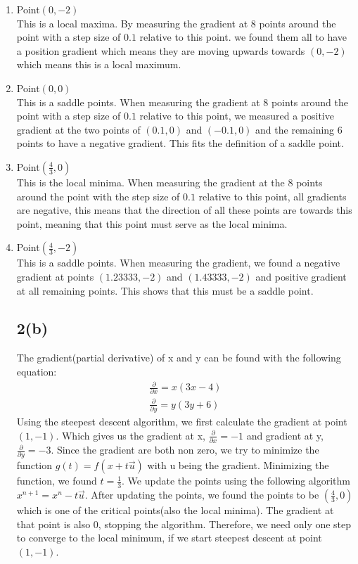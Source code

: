 \documentclass{article}
\begin{document}
\begin{enumerate}
\item Point$(0,-2)$\\
This is a local maxima. By measuring the gradient at 8 points around the point with a step size of $0.1$ relative to this point. we found them all to have a position gradient which means they are moving upwards towards $(0,-2)$ which means this is a local maximum.
\item Point$(0,0)$\\
This is a saddle points. When measuring the gradient at 8 points around the point with a step size of $0.1$ relative to this point, we measured a positive gradient at the two points of $(0.1,0)$ and $(-0.1,0)$ and the remaining 6 points to have a negative gradient. This fits the definition of a saddle point.
\item Point$(\frac{4}{3},0)$\\
This is the local minima. When measuring the gradient at the 8 points around the point with the step size of $0.1$ relative to this point, all gradients are negative, this means that the direction of all these points are towards this point, meaning that this point must serve as the local minima.
\item Point$(\frac{4}{3},-2)$\\
This is a saddle points. When measuring the gradient, we found a negative gradient at points $(1.23333,-2)$ and $(1.43333,-2)$ and positive gradient at all remaining points. This shows that this must be a saddle point.
\subsection*{2(b)}
The gradient(partial derivative) of x and y can be found with the following equation:
\begin{equation*}
\begin{aligned}
\frac{\partial}{\partial x}  = x(3x - 4)\\
\frac{\partial}{\partial y}  = y(3y + 6)
\end{aligned}
\end{equation*}
Using the steepest descent algorithm, we first calculate the gradient at point $(1,-1)$. Which gives us the gradient at x, $\frac{\partial}{\partial x} = -1$ and gradient at y, $\frac{\partial}{\partial y} = -3$. Since the gradient are both non zero, we try to minimize the function $g(t) = f(x + t\vec{u})$ with u being the gradient. Minimizing the function, we found $t = \frac{1}{3}$. We update the points using the following algorithm $x^{n+1} = x^{n} - t\vec{u}$. After updating the points, we found the points to be $(\frac{4}{3},0)$ which is one of the critical points(also the local minima). The gradient at that point is also $0$, stopping the algorithm. Therefore, we need only one step to converge to the local minimum, if we start steepest descent at point $(1,-1)$.

\end{enumerate}
\end{document}
